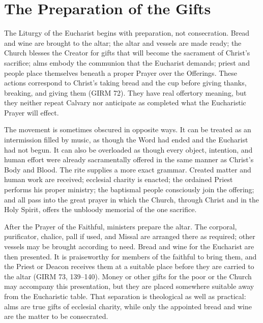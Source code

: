 \section{The Preparation of the Gifts}

The Liturgy of the Eucharist begins with preparation, not consecration. Bread and wine are brought to the altar; the altar and vessels are made ready; the Church blesses the Creator for gifts that will become the sacrament of Christ's sacrifice; alms embody the communion that the Eucharist demands; priest and people place themselves beneath a proper Prayer over the Offerings. These actions correspond to Christ's taking bread and the cup before giving thanks, breaking, and giving them (GIRM 72). They have real offertory meaning, but they neither repeat Calvary nor anticipate as completed what the Eucharistic Prayer will effect.

The movement is sometimes obscured in opposite ways. It can be treated as an intermission filled by music, as though the Word had ended and the Eucharist had not begun. It can also be overloaded as though every object, intention, and human effort were already sacramentally offered in the same manner as Christ's Body and Blood. The rite supplies a more exact grammar. Created matter and human work are received; ecclesial charity is enacted; the ordained Priest performs his proper ministry; the baptismal people consciously join the offering; and all pass into the great prayer in which the Church, through Christ and in the Holy Spirit, offers the unbloody memorial of the one sacrifice.


After the Prayer of the Faithful, ministers prepare the altar. The corporal, purificator, chalice, pall if used, and Missal are arranged there as required; other vessels may be brought according to need. Bread and wine for the Eucharist are then presented. It is praiseworthy for members of the faithful to bring them, and the Priest or Deacon receives them at a suitable place before they are carried to the altar (GIRM 73, 139--140). Money or other gifts for the poor or the Church may accompany this presentation, but they are placed somewhere suitable away from the Eucharistic table. That separation is theological as well as practical: alms are true gifts of ecclesial charity, while only the appointed bread and wine are the matter to be consecrated.

